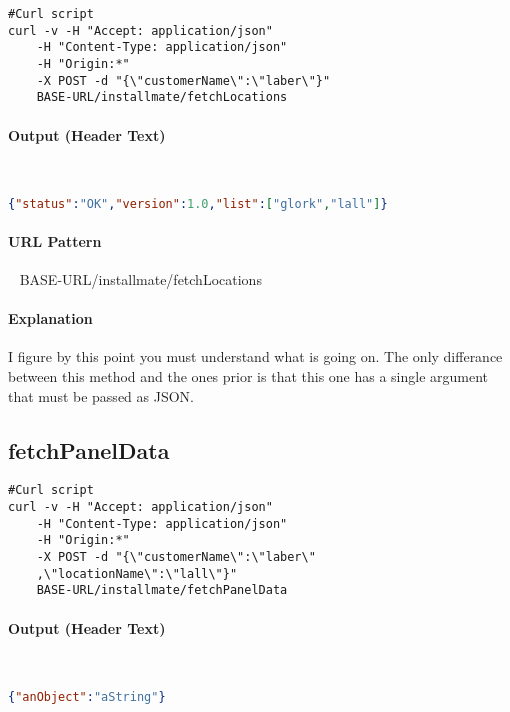 \documentclass[
10pt, %
letterpaper, %
oneside, %
headinclude,footinclude, %
BCOR5mm, %
]{scrartcl}
\begin{document}
\begin{lstlisting}
#Curl script
curl -v -H "Accept: application/json" 
	-H "Content-Type: application/json" 
	-H "Origin:*"
	-X POST -d "{\"customerName\":\"laber\"}" 
	BASE-URL/installmate/fetchLocations
\end{lstlisting}

\paragraph{Output (Header Text)}~
\begin{lstlisting}[language=json]
{"status":"OK","version":1.0,"list":["glork","lall"]}
\end{lstlisting}

\paragraph{URL Pattern} 
~\newline
BASE-URL/installmate/fetchLocations

\paragraph{Explanation} I figure by this point you must understand what is going on. The only differance between this method and the ones prior is that this one has a single argument that must be passed as JSON.



\subsection{\textbf{fetchPanelData}}

\begin{lstlisting}
#Curl script
curl -v -H "Accept: application/json" 
	-H "Content-Type: application/json" 
	-H "Origin:*"
	-X POST -d "{\"customerName\":\"laber\"
	,\"locationName\":\"lall\"}"
	BASE-URL/installmate/fetchPanelData
\end{lstlisting}

\paragraph{Output (Header Text)}~
\begin{lstlisting}[language=json]
{"anObject":"aString"}
\end{lstlisting}
\end{document}
